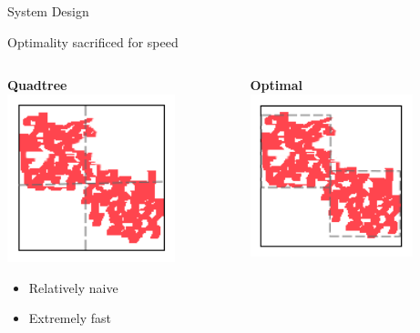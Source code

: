 \documentclass[9pt]{beamer}
\begin{document}
\begin{frame}{System Design}
    \begin{block}{Optimality sacrificed for speed}
    \end{block}
    \begin{columns}
        \begin{column}{0.5\textwidth}
            \begin{center}
                \textbf{Quadtree}
                \linebreak
                \includegraphics[width=0.75\textwidth,trim={0cm 0cm 0cm 0cm},clip]{img/quadtree_exA.png}
                \begin{itemize}
                        \item Relatively naive
    	                \item Extremely fast
                \end{itemize}
            \end{center}
        \end{column}
        \begin{column}{0.5\textwidth}
            \begin{center}
                \textbf{Optimal}
                \linebreak
                \includegraphics[width=0.75\textwidth,trim={0cm 0cm 0cm 0cm},clip]{img/quadtree_exB.png}

\end{center}
\end{column}
\end{columns}
\end{frame}
\end{document}
